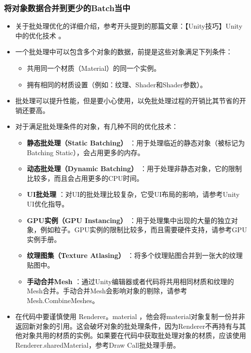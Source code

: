 \documentclass[9pt, b5paper]{article}
\begin{document}
\subsubsection{将对象数据合并到更少的Batch当中}
\label{sec-6-3-5}
\begin{itemize}
\item 关于批处理优化的详细介绍，参考开头提到的那篇文章：【Unity技巧】Unity中的优化技术 。
\item 一个批处理中可以包含多个对象的数据，前提是这些对象满足下列条件：
\begin{itemize}
\item 共用同一个材质（Material）的同一个实例。
\item 拥有相同的材质设置（例如：纹理、Shader和Shader参数）。
\end{itemize}
\item 批处理可以提升性能，但是要小心使用，以免批处理过程的开销比其节省的开销还要高。
\item 对于满足批处理条件的对象，有几种不同的优化技术：
\begin{itemize}
\item \textbf{静态批处理（Static Batching）} ：用于处理临近的静态对象（被标记为Batching Static），会占用更多的内存。
\item \textbf{动态批处理（Dynamic Batching）} ：用于处理非静态对象，它的限制比较多，而且会占用更多的CPU时间。
\item \textbf{UI批处理} ：对UI的批处理比较复杂，它受UI布局的影响，请参考Unity UI优化指导。
\item \textbf{GPU实例（GPU Instancing）} ：用于处理集中出现的大量的独立对象，例如粒子。GPU实例的限制比较多，而且需要硬件支持，请参考GPU实例手册。
\item \textbf{纹理图集（Texture Atlasing）} ：将多个纹理贴图合并到一张大的纹理贴图中。
\item \textbf{手动合并Mesh} ：通过Unity编辑器或者代码将共用相同材质和纹理的Mesh合并。手动合并Mesh会影响对象的剔除，请参考Mesh.CombineMeshes。
\end{itemize}
\item 在代码中要谨慎使用 Renderer。material ，他会将material对象复制一份并非返回新对象的引用。这会破坏对象的批处理条件，因为Renderer不再持有与其他对象共用的材质的实例。如果要在代码中获取批处理对象的材质，应该使用 Renderer.sharedMaterial，参考Draw Call批处理手册。
\end{itemize}
\end{document}
